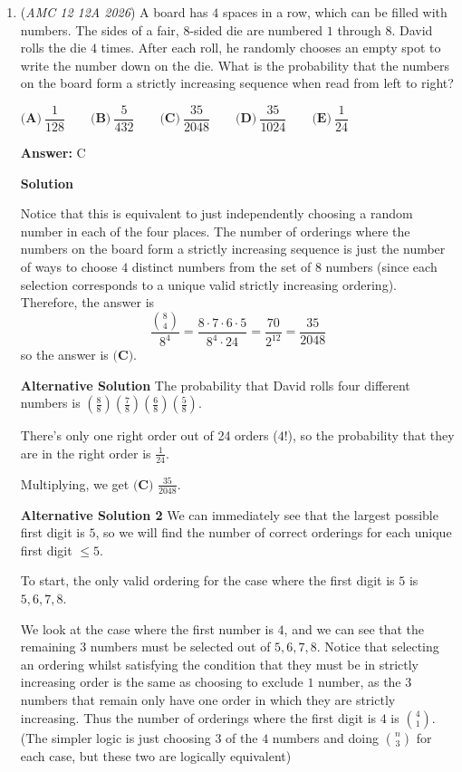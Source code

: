 \begin{enumerate}
	\item (\textit{AMC 12 12A 2026}) A board has $4$ spaces in a row, which can be filled with numbers. The sides of a fair, $8$-sided die are numbered $1$ through $8$. David rolls the die $4$ times. After each roll, he randomly chooses an empty spot to write the number down on the die. What is the probability that the numbers on the board form a strictly increasing sequence when read from left to right?


 $\textbf{(A)}\   \dfrac{1}{128}  \qquad 	\textbf{(B)}\   \dfrac{5}{432}  \qquad 	\textbf{(C)}\   \dfrac{35}{2048}  \qquad 	\textbf{(D)}\   \dfrac{35}{1024}  \qquad 	\textbf{(E)}\   \dfrac{1}{24}$

 \textbf{Answer: }C



\textbf{Solution}

Notice that this is equivalent to just independently choosing a random number in each of the four places. The number of orderings where the numbers on the board form a strictly increasing sequence is just the number of ways to choose $4$ distinct numbers from the set of $8$ numbers (since each selection corresponds to a unique valid strictly increasing ordering). Therefore, the answer is
 \[\frac{\binom{8}{4}}{8^4}=\frac{8\cdot 7\cdot 6\cdot 5}{8^4\cdot 24}=\frac{70}{2^{12}}=\frac{35}{2048}\]so the answer is $\boxed{\textbf{(C)}}$.

 \textbf{Alternative Solution} The probability that David rolls four different numbers is $\left(\frac{8}{8}\right)\left(\frac{7}{8}\right)\left(\frac{6}{8}\right)\left(\frac{5}{8}\right)$.

 There's only one right order out of 24 orders ($4!$), so the probability that they are in the right order is $\frac{1}{24}$.

 Multiplying, we get $\boxed{\textbf{(C) } \frac{35}{2048}}$.

 \textbf{Alternative Solution 2} We can immediately see that the largest possible first digit is $5$, so we will find the number of correct orderings for each unique first digit $\leq 5$.

 To start, the only valid ordering for the case where the first digit is $5$ is $5, 6, 7, 8$.

 We look at the case where the first number is $4$, and we can see that the remaining $3$ numbers must be selected out of ${5, 6, 7, 8}$. Notice that selecting an ordering whilst satisfying the condition that they must be in strictly increasing order is the same as choosing to exclude $1$ number, as the $3$ numbers that remain only have one order in which they are strictly increasing. Thus the number of orderings where the first digit is $4$ is $\binom{4}{1}$. (The simpler logic is just choosing $3$ of the $4$ numbers and doing $\binom{n}{3}$ for each case, but these two are logically equivalent)


\end{enumerate}
